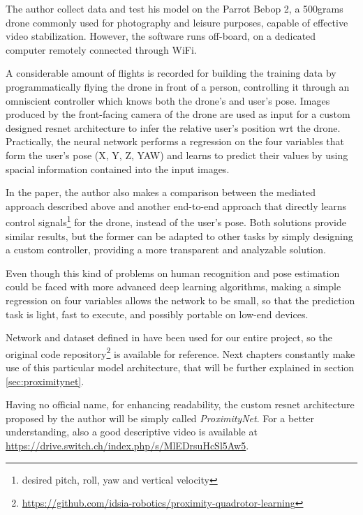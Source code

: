 The author collect data and test his model on the Parrot Bebop 2, a 500grams drone commonly used for photography and leisure purposes, capable of effective video stabilization. However, the software runs off-board, on a dedicated computer remotely connected through WiFi. 

A considerable amount of flights is recorded for building the training data by programmatically flying the drone in front of a person, controlling it through an omniscient controller which knows both the drone's and user's pose. Images produced by the front-facing camera of the drone are used as input for a custom designed \gls{resnet} architecture to infer the relative user's position \gls{wrt} the drone. Practically, the neural network performs a regression on the four variables that form the user's pose (X, Y, Z, YAW) and learns to predict their values by using spacial information contained into the input images. 

In the paper, the author also makes a comparison between the mediated approach described above and another end-to-end approach that directly learns control signals\footnote{desired pitch, roll, yaw and vertical velocity} for the drone, instead of the user's pose. Both solutions provide similar results, but the former can be adapted to other tasks by simply designing a custom controller, providing a more transparent and analyzable solution.

Even though this kind of problems on human recognition and pose estimation could be faced with more advanced deep learning algorithms, making a simple regression on four variables allows the network to be small, so that the prediction task is light, fast to execute, and possibly portable on low-end devices.

\medskip

Network and dataset defined in \cite{mantegazza2019visionbased} have been used for our entire project, so the original code repository\footnote{\url{https://github.com/idsia-robotics/proximity-quadrotor-learning}} is available for reference. Next chapters constantly make use of this particular model architecture, that will be further explained in section \ref{sec:proximitynet}. 

Having no official name, for enhancing readability, the custom \gls{resnet} architecture proposed by the author will be simply called \textit{ProximityNet}. For a better understanding, also a good descriptive video is available at \url{https://drive.switch.ch/index.php/s/MlEDrsuHcSl5Aw5}.



